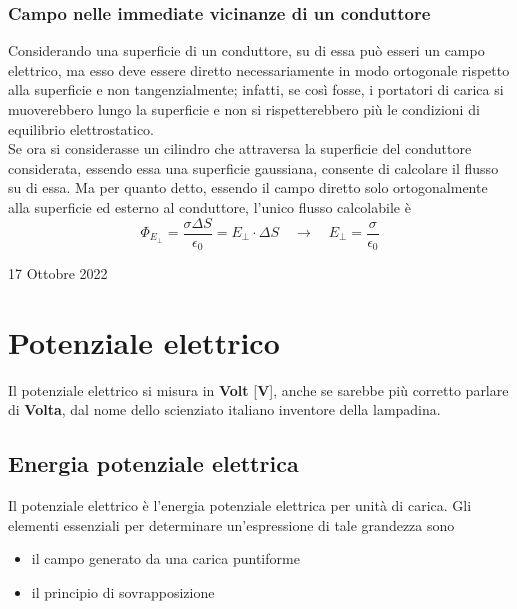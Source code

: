 \documentclass[a4paper]{extarticle}
\begin{document}
\vspace{1em}
\subsubsection{Campo nelle immediate vicinanze di un conduttore}
Considerando una superficie di un conduttore, su di essa può esseri un campo elettrico, ma esso deve essere diretto necessariamente in modo ortogonale rispetto alla superficie e non tangenzialmente; infatti, se così fosse, i portatori di carica si muoverebbero lungo la superficie e non si rispetterebbero più le condizioni di equilibrio elettrostatico.\\
Se ora si considerasse un cilindro che attraversa la superficie del conduttore considerata, essendo essa una superficie gaussiana, consente di calcolare il flusso su di essa. Ma per quanto detto, essendo il campo diretto solo ortogonalmente alla superficie ed esterno al conduttore, l'unico flusso calcolabile è
\[\Phi_{E_\perp} = \frac{\sigma \Delta S}{\epsilon_0} = E_\perp \cdot \Delta S \hspace{1em} \rightarrow \hspace{1em} E_\perp = \frac{\sigma}{\epsilon_0}\]

\newpage
\noindent
\begin{center}
  17 Ottobre 2022
\end{center}
\section{Potenziale elettrico}
Il potenziale elettrico si misura in \textbf{Volt} [\textbf{V}], anche se sarebbe più corretto parlare di \textbf{Volta}, dal nome dello scienziato italiano inventore della lampadina.

\vspace{1em}
\noindent
\subsection{Energia potenziale elettrica}
Il potenziale elettrico è l'energia potenziale elettrica per unità di carica. Gli elementi essenziali per determinare un'espressione di tale grandezza sono
\begin{itemize}
  \item il campo generato da una carica puntiforme
  \item il principio di sovrapposizione
\end{itemize}

\vspace{1em}
\noindent
\end{document}
